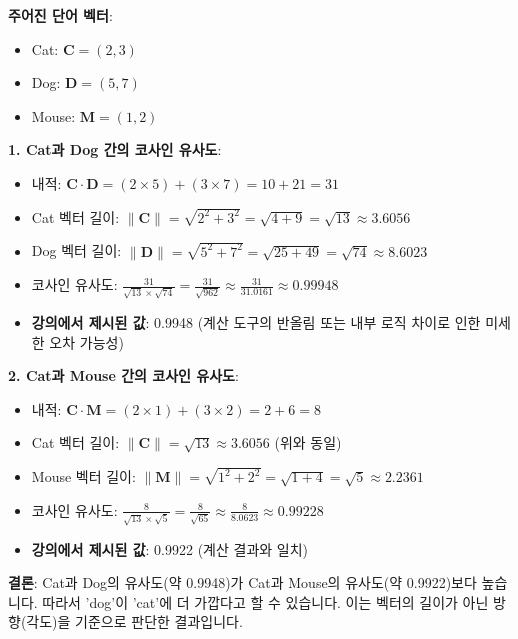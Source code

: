 \documentclass[11pt,a4paper]{article}
\begin{document}
\begin{examplebox}
\textbf{주어진 단어 벡터}:
\begin{itemize}
    \item Cat: $\mathbf{C} = (2, 3)$
    \item Dog: $\mathbf{D} = (5, 7)$
    \item Mouse: $\mathbf{M} = (1, 2)$
\end{itemize}

\textbf{1. Cat과 Dog 간의 코사인 유사도}:
\begin{itemize}
    \item 내적: $\mathbf{C} \cdot \mathbf{D} = (2 \times 5) + (3 \times 7) = 10 + 21 = 31$
    \item Cat 벡터 길이: $\|\mathbf{C}\| = \sqrt{2^2 + 3^2} = \sqrt{4 + 9} = \sqrt{13} \approx 3.6056$
    \item Dog 벡터 길이: $\|\mathbf{D}\| = \sqrt{5^2 + 7^2} = \sqrt{25 + 49} = \sqrt{74} \approx 8.6023$
    \item 코사인 유사도: $\frac{31}{\sqrt{13} \times \sqrt{74}} = \frac{31}{\sqrt{962}} \approx \frac{31}{31.0161} \approx 0.99948$
    \item \textbf{강의에서 제시된 값}: 0.9948 (계산 도구의 반올림 또는 내부 로직 차이로 인한 미세한 오차 가능성)
\end{itemize}

\textbf{2. Cat과 Mouse 간의 코사인 유사도}:
\begin{itemize}
    \item 내적: $\mathbf{C} \cdot \mathbf{M} = (2 \times 1) + (3 \times 2) = 2 + 6 = 8$
    \item Cat 벡터 길이: $\|\mathbf{C}\| = \sqrt{13} \approx 3.6056$ (위와 동일)
    \item Mouse 벡터 길이: $\|\mathbf{M}\| = \sqrt{1^2 + 2^2} = \sqrt{1 + 4} = \sqrt{5} \approx 2.2361$
    \item 코사인 유사도: $\frac{8}{\sqrt{13} \times \sqrt{5}} = \frac{8}{\sqrt{65}} \approx \frac{8}{8.0623} \approx 0.99228$
    \item \textbf{강의에서 제시된 값}: 0.9922 (계산 결과와 일치)
\end{itemize}

\textbf{결론}:
Cat과 Dog의 유사도(약 0.9948)가 Cat과 Mouse의 유사도(약 0.9922)보다 높습니다. 따라서 'dog'이 'cat'에 더 가깝다고 할 수 있습니다. 이는 벡터의 길이가 아닌 방향(각도)을 기준으로 판단한 결과입니다.
\end{examplebox}

\newpage
\end{document}
